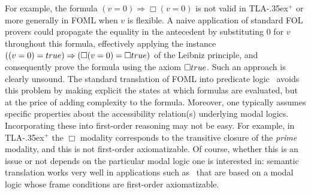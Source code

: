 \documentclass{easychair}
\renewcommand{\implies}{\Rightarrow}
\newcommand{\tlaplus}{\mbox{TLA\kern -.35ex$^+$}\xspace}
\newcommand{\edmargin}[2]{\marginpar{\raggedright\footnotesize\color{red}#1: #2}}
\newcommand{\edmargin}[2]{}
\def\llnote{\ednote{LL}}
\def\smmargin{\edmargin{SM}}
\newcommand{\TRUE}{\mbox{\sc true}}
\begin{document}
For example, the formula $(v=0) \implies \Box(v=0)$ is not valid in \tlaplus or
more generally in FOML when $v$ is flexible.
A naive application of standard FOL provers could
propagate the equality in the antecedent by substituting $0$ for $v$
throughout this formula, effectively applying the instance
$((v=0) = \TRUE) \implies (\Box(v=0) = \Box\TRUE)$
of the Leibniz principle, and consequently prove the formula using the axiom
$\Box\TRUE$. Such an approach is clearly unsound.
The standard translation of FOML into predicate logic~\cite{ohlbach:translation}
avoids this problem by making explicit the states at which formulas are
evaluated, but at the price of adding complexity to the formula. Moreover, one
typically assumes specific properties about the accessibility relation(s)
underlying modal logics.  Incorporating these into first-order reasoning may
not be easy. For example, in \tlaplus the $\Box$ modality corresponds to the
transitive closure of the \emph{prime} modality, and this is not first-order
axiomatizable. Of course, whether this is an issue or not depends on the
particular modal logic one is interested in: semantic translation works very
well in applications such as~\cite{benzmueller:god} that are based on a modal
logic whose frame conditions are first-order axiomatizable.





\end{document}
